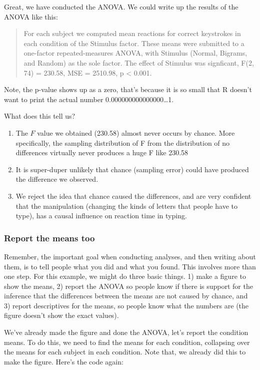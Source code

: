 \documentclass[
]{book}
\begin{document}
Great, we have conducted the ANOVA. We could write up the results of the ANOVA like this:

\begin{quote}
For each subject we computed mean reactions for correct keystrokes in each condition of the Stimulus factor. These means were submitted to a one-factor repeated-measures ANOVA, with Stimulus (Normal, Bigrams, and Random) as the sole factor. The effect of Stimulus was signficant, F(2, 74) = 230.58, MSE = 2510.98, p \textless{} 0.001.
\end{quote}

Note, the p-value shows up as a zero, that's because it is so small that R doesn't want to print the actual number 0.000000000000000\ldots1.

What does this tell us?

\begin{enumerate}
\def\labelenumi{\arabic{enumi}.}
\item
  The \(F\) value we obtained (230.58) almost never occurs by chance. More specifically, the sampling distribution of F from the distribution of no differences virtually never produces a huge F like 230.58
\item
  It is super-duper unlikely that chance (sampling error) could have produced the difference we observed.
\item
  We reject the idea that chance caused the differences, and are very confident that the manipulation (changing the kinds of letters that people have to type), has a causal influence on reaction time in typing.
\end{enumerate}

\hypertarget{report-the-means-too}{%
\subsubsection{Report the means too}\label{report-the-means-too}}

Remember, the important goal when conducting analyses, and then writing about them, is to tell people what you did and what you found. This involves more than one step. For this example, we might do three basic things. 1) make a figure to show the means, 2) report the ANOVA so people know if there is support for the inference that the differences between the means are not caused by chance, and 3) report descriptives for the means, so people know what the numbers are (the figure doesn't show the exact values).

We've already made the figure and done the ANOVA, let's report the condition means. To do this, we need to find the means for each condition, collapsing over the means for each subject in each condition. Note that, we already did this to make the figure. Here's the code again:
\end{document}
